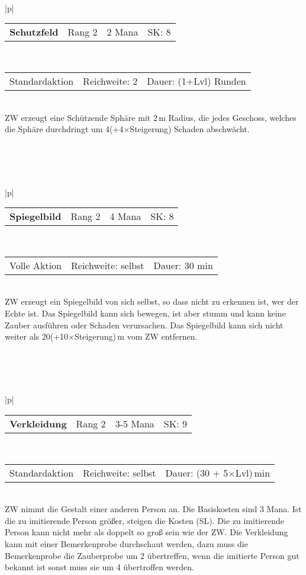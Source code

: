 \documentclass[../../Heldenanleitung2]{subfiles}
\begin{document}
\\\\\\
\begin{tabular}{|p{\textwidth}|}
\hline
\begin{tabularx}{\textwidth}{X|X|X|X}
\textbf{Schutzfeld} & Rang 2 & 2 Mana & SK: 8
\end{tabularx} \\ \hline
\begin{tabularx}{\textwidth}{X|X|X}
Standardaktion & Reichweite: 2 & Dauer: (1+Lvl) Runden
\end{tabularx} \\ \hline
ZW erzeugt eine Schützende Sphäre mit 2\,m Radius, die jedes Geschoss, welches die Sphäre durchdringt um 4(+4$\times$Steigerung) Schaden abschwächt.
\\ \hline
\end{tabular}
\\\\\\
\begin{tabular}{|p{\textwidth}|}
\hline
\begin{tabularx}{\textwidth}{X|X|X|X}
\textbf{Spiegelbild} & Rang 2 & 4 Mana & SK: 8
\end{tabularx} \\ \hline
\begin{tabularx}{\textwidth}{X|X|X}
Volle Aktion & Reichweite: selbst & Dauer: 30 min
\end{tabularx} \\ \hline
ZW erzeugt ein Spiegelbild von sich selbst, so dass nicht zu erkennen ist, wer der Echte ist. Das Spiegelbild kann sich bewegen, ist aber stumm und kann keine Zauber ausführen oder Schaden verursachen. Das Spiegelbild kann sich nicht weiter als 20(+10$\times$Steigerung)\,m vom ZW entfernen.
\\ \hline
\end{tabular}
\\\\\\
\begin{tabular}{|p{\textwidth}|}
\hline
\begin{tabularx}{\textwidth}{X|X|X|X}
\textbf{Verkleidung} & Rang 2 & 3-5 Mana & SK: 9
\end{tabularx} \\ \hline
\begin{tabularx}{\textwidth}{X|X|X}
Standardaktion & Reichweite: selbst & Dauer: (30 + 5$\times$Lvl)\,min
\end{tabularx} \\ \hline
ZW nimmt die Gestalt einer anderen Person an. Die Basiskosten sind 3 Mana. Ist die zu imitierende Person größer, steigen die Kosten (SL). Die zu imitierende Person kann nicht mehr als doppelt so groß sein wie der ZW. Die Verkleidung kann mit einer Bemerkenprobe durchschaut werden, dazu muss die Bemerkenprobe die Zauberprobe um 2 übertreffen, wenn die imitierte Person gut bekannt ist sonst muss sie um 4 übertroffen werden.
\\ \hline
\end{tabular}
\end{document}
